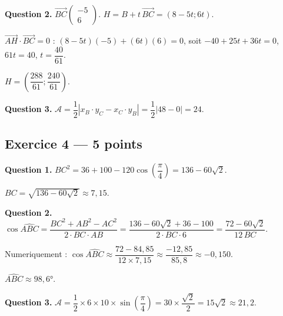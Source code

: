 \textbf{Question 2.}
$\overrightarrow{BC}\begin{pmatrix} -5 \\ 6 \end{pmatrix}$. $H = B + t\,\overrightarrow{BC} = (8 - 5t; 6t)$.

$\overrightarrow{AH} \cdot \overrightarrow{BC} = 0$ : $(8-5t)(-5) + (6t)(6) = 0$, soit $-40 + 25t + 36t = 0$, $61t = 40$, $t = \dfrac{40}{61}$.

$H = \left(\dfrac{288}{61}; \dfrac{240}{61}\right)$.

\textbf{Question 3.}
$\mathcal{A} = \dfrac{1}{2} |x_B \cdot y_C - x_C \cdot y_B| = \dfrac{1}{2} |48 - 0| = 24$.

\subsection*{Exercice 4 — 5 points}


\textbf{Question 1.}
$BC^2 = 36 + 100 - 120\cos\!\left(\dfrac{\pi}{4}\right) = 136 - 60\sqrt{2}$.

$BC = \sqrt{136 - 60\sqrt{2}} \approx 7{,}15$.

\textbf{Question 2.}
$\cos\widehat{ABC} = \dfrac{BC^2 + AB^2 - AC^2}{2 \cdot BC \cdot AB} = \dfrac{136 - 60\sqrt{2} + 36 - 100}{2 \cdot BC \cdot 6} = \dfrac{72 - 60\sqrt{2}}{12\,BC}$.

Numeriquement : $\cos\widehat{ABC} \approx \dfrac{72 - 84{,}85}{12 \times 7{,}15} \approx \dfrac{-12{,}85}{85{,}8} \approx -0{,}150$.

$\widehat{ABC} \approx 98{,}6°$.

\textbf{Question 3.}
$\mathcal{A} = \dfrac{1}{2} \times 6 \times 10 \times \sin\!\left(\dfrac{\pi}{4}\right) = 30 \times \dfrac{\sqrt{2}}{2} = 15\sqrt{2} \approx 21{,}2$.

